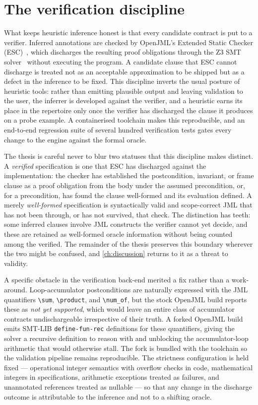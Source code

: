 \section{The verification discipline}
\label{sec:inf-verification}

What keeps heuristic inference honest is that every candidate contract is put to a
verifier. Inferred annotations are checked by OpenJML's Extended Static Checker
(ESC)~\citep{cok2014openjml}, which discharges the resulting proof obligations
through the Z3 SMT solver~\citep{demoura2008z3} without executing the program. A
candidate clause that ESC cannot discharge is treated not as an acceptable
approximation to be shipped but as a defect in the inference to be fixed. This
discipline inverts the usual posture of heuristic tools: rather than emitting
plausible output and leaving validation to the user, the inferrer is developed
against the verifier, and a heuristic earns its place in the repertoire only once
the verifier has discharged the clause it produces on a probe example. A
containerised toolchain makes this reproducible, and an end-to-end regression suite
of several hundred verification tests gates every change to the engine against the
formal oracle.

The thesis is careful never to blur two statuses that this discipline makes
distinct. A \emph{verified} specification is one that ESC has discharged against the
implementation: the checker has established the postcondition, invariant, or frame
clause as a proof obligation from the body under the assumed precondition, or, for a
precondition, has found the clause well-formed and its evaluation defined. A merely
\emph{well-formed} specification is syntactically valid and scope-correct JML that
has not been through, or has not survived, that check. The distinction has teeth:
some inferred clauses involve JML constructs the verifier cannot yet decide, and
these are retained as well-formed oracle information without being counted among the
verified. The remainder of the thesis preserves this boundary wherever the two
might be confused, and \cref{ch:discussion} returns to it as a threat to validity.

A specific obstacle in the verification back-end merited a fix rather than a
work-around. Loop-accumulator postconditions are naturally expressed with the JML
quantifiers \lstinline|\sum|, \lstinline|\product|, and \lstinline|\num_of|, but
the stock OpenJML build reports these as \emph{not yet supported}, which would leave
an entire class of accumulator contracts undischargeable irrespective of their
truth. A forked OpenJML build emits SMT-LIB \lstinline|define-fun-rec| definitions
for these quantifiers, giving the solver a recursive definition to reason with and
unblocking the accumulator-loop arithmetic that would otherwise stall. The fork is
bundled with the toolchain so the validation pipeline remains reproducible. The
strictness configuration is held fixed --- operational integer semantics with
overflow checks in code, mathematical integers in specifications, arithmetic
exceptions treated as failures, and unannotated references treated as nullable ---
so that any change in the discharge outcome is attributable to the inference and not
to a shifting oracle.


